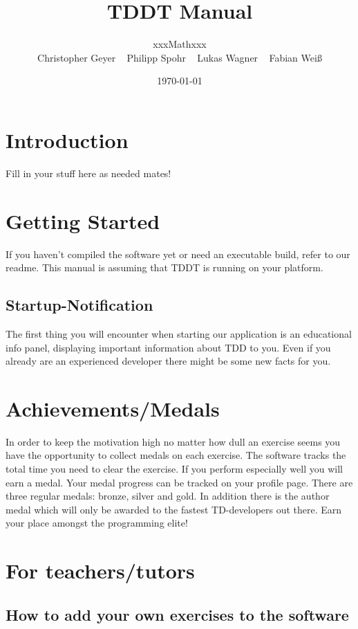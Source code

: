 \documentclass[10pt,a4paper]{article}
\begin{document}
\title{\large TDDT Manual}
\date{\small \today}
\author{\normalsize xxxMathxxx \\
Christopher Geyer ~
Philipp Spohr ~
Lukas Wagner ~
Fabian Weiß }
\maketitle
\tableofcontents
\section{Introduction}
Fill in your stuff here as needed mates!
\section{Getting Started}
If you haven't compiled the software yet or need an executable build, refer to our readme. This manual is assuming that TDDT is running on your platform.
\subsection{Startup-Notification}
The first thing you will encounter when starting our application is an educational info panel, displaying important information about TDD to you. Even if you already are an experienced developer there might be some new facts for you.
\section{Achievements/Medals}
In order to keep the motivation high no matter how dull an exercise seems you have the opportunity to
collect medals on each exercise. The software tracks the total time you need to clear the exercise. If you perform especially well you will earn
a medal. Your medal progress can be tracked on your profile page.
There are three regular medals: bronze, silver and gold. In addition there is the author medal which will only be awarded to the fastest TD-developers out there.
Earn your place amongst the programming elite!
\section{For teachers/tutors}
\subsection{How to add your own exercises to the software}
\end{document}
